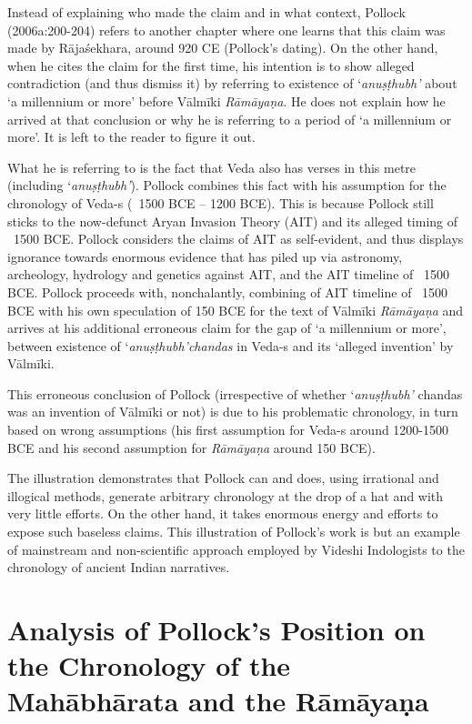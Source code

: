 Instead of explaining who made the claim and in what context, Pollock (2006a:200-204) refers to another chapter where one learns that this claim was made by Rājaśekhara, around 920 CE (Pollock’s dating). On the other hand, when he cites the claim for the first time, his intention is to show alleged contradiction (and thus dismiss it) by referring to existence of ‘\textit{anuṣṭhubh’} about ‘a millennium or more’ before Vālmīki \textit{Rāmāyaṇa}. He does not explain how he arrived at that conclusion or why he is referring to a period of ‘a millennium or more’. It is left to the reader to figure it out.

What he is referring to is the fact that Veda also has verses in this metre (including ‘\textit{anuṣṭhubh’}). Pollock combines this fact with his assumption for the chronology of Veda-s (~1500 BCE – 1200 BCE). This is because Pollock still sticks to the now-defunct Aryan Invasion Theory (AIT) and its alleged timing of ~1500 BCE. Pollock considers the claims of AIT as self-evident, and thus displays ignorance towards enormous evidence that has piled up via astronomy, archeology, hydrology and genetics against AIT, and the AIT timeline of ~1500 BCE. Pollock proceeds with, nonchalantly, combining of AIT timeline of ~1500 BCE with his own speculation of 150 BCE for the text of Vālmīki \textit{Rāmāyaṇa} and arrives at his additional erroneous claim for the gap of ‘a millennium or more’, between existence of ‘\textit{anuṣṭhubh’}\textit{chandas} in Veda-s and its ‘alleged invention’ by Vālmīki.

This erroneous conclusion of Pollock (irrespective of whether ‘\textit{anuṣṭhubh’} chandas was an invention of Vālmīki or not) is due to his problematic chronology, in turn based on wrong assumptions (his first assumption for Veda-s around 1200-1500 BCE and his second assumption for \textit{Rāmāyaṇa} around 150 BCE).

The illustration demonstrates that Pollock can and does, using irrational and illogical methods, generate arbitrary chronology at the drop of a hat and with very little efforts. On the other hand, it takes enormous energy and efforts to expose such baseless claims. This illustration of Pollock’s work is but an example of mainstream and non-scientific approach employed by Videshi Indologists to the chronology of ancient Indian narratives.


\section*{Analysis of Pollock’s Position on the Chronology of the Mahābhārata and the Rāmāyaṇa}

